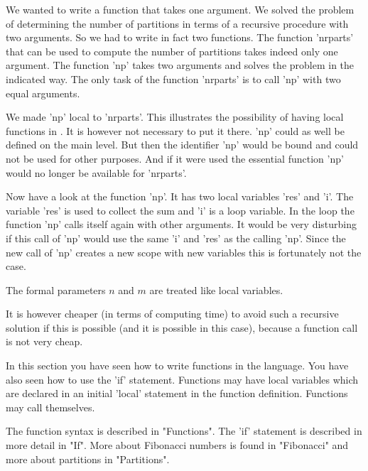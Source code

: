 We wanted to  write a function that  takes one argument.   We solved  the
problem of determining the number  of partitions in  terms of a recursive
procedure with two arguments.  So we had to write  in fact two functions.
The  function  'nrparts' that  can  be  used  to  compute the  number  of
partitions takes indeed only one  argument.  The  function 'np' takes two
arguments and solves the problem in the indicated way.  The  only task of
the function 'nrparts' is to call 'np' with two equal arguments.

We made 'np'  local to 'nrparts'.   This  illustrates the  possibility of
having local functions in {\GAP}.   It is however not necessary to put it
there.  'np' could as  well be defined on the main level.   But  then the
identifier 'np'  would be bound and could not be used for other purposes.
And  if  it were used  the essential  function  'np' would no  longer  be
available for 'nrparts'.

Now have  a look at the function  'np'.  It has two local variables 'res'
and 'i'.  The variable 'res' is used to collect the sum and 'i' is a loop
variable.  In the loop  the  function 'np' calls itself again with  other
arguments.  It would be  very disturbing if this call of  'np' would  use
the same 'i' and 'res'  as  the calling 'np'.  Since the new call of 'np'
creates a new scope with new variables this is fortunately not the case.

The formal parameters $n$ and $m$ are treated like local variables.

It  is however  cheaper  (in  terms of  computing time)  to avoid such  a
recursive solution if this is possible (and it is possible in this case),
because a function call is not very cheap.

In this section you  have  seen  how  to  write  functions in  the {\GAP}
language.  You have  also seen how to use the 'if' statement.   Functions
may  have  local  variables which  are  declared in  an  initial  'local'
statement in the function definition.  Functions may call themselves.

The function syntax is described  in "Functions".   The 'if' statement is
described in more detail in "If".  More about  Fibonacci numbers is found
in "Fibonacci" and more about partitions in "Partitions".


